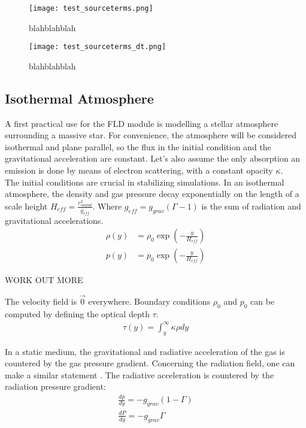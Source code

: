 \begin{figure}
\texttt{[image: test\_sourceterms.png]}
\label{fig: test_sourceterms}
\caption{blahblahblah}
\end{figure}

\begin{figure}
\texttt{[image: test\_sourceterms\_dt.png]}
\label{fig: test_sourceterms}
\caption{blahblahblah}
\end{figure}

\subsection{Isothermal Atmosphere}
A first practical use for the FLD module is modelling a stellar atmosphere surrounding a massive star. For convenience, the atmosphere will be considered isothermal and plane parallel, so the flux in the initial condition and the gravitational acceleration are constant. Let's also assume the only absorption an emission is done by means of electron scattering, with a constant opacity $\kappa$.\\

The initial conditions are crucial in stabilizing simulations. In an isothermal atmosphere, the density and gas pressure decay exponentially on the length of a scale height $H_{eff} = \frac{c_{sound}^2}{g_{eff}}$. Where $g_{eff} = g_{grav}(\Gamma - 1)$ is the sum of radiation and gravitational accelerations. 
\begin{align}
\rho(y) &= \rho_0 \exp \left( -\frac{y}{H_{eff}} \right) \\
 p(y)   &= p_0    \exp \left( -\frac{y}{H_{eff}} \right)
\end{align}

WORK OUT MORE

The velocity field is $\vec{0}$ everywhere. Boundary conditions $\rho_0$ and $p_0$ can be computed by defining the optical depth $\tau$. 
\begin{align}
\tau(y) = \int^\infty_{y} \kappa \rho dy  \label{eq: opt_depth}
\end{align}

In a static medium, the gravitational and radiative acceleration of the gas is countered by the gas pressure gradient. Concerning the radiation field, one can make a similar statement . The radiative acceleration is countered by the radiation pressure gradient:
\begin{align}
\frac{dp}{dy} = -g_{grav}(1 - \Gamma) \label{eq: p_cond} \\
\frac{dP}{dy} = -g_{grav} \Gamma \label{eq: P_cond}
\end{align}

